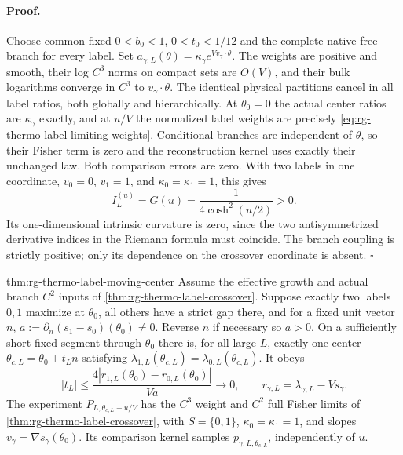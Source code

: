 \paragraph{Proof.}
Choose common fixed $0<b_0<1$, $0<t_0<1/12$ and the complete native
free branch for every label. Set
$a_{\gamma,L}(\theta)=\kappa_\gamma e^{Vv_\gamma\cdot\theta}$.
The weights are positive and smooth, their log $C^3$ norms on compact
sets are $O(V)$, and their bulk logarithms converge in $C^3$ to
$v_\gamma\cdot\theta$. The identical physical partitions cancel in
all label ratios, both globally and hierarchically. At $\theta_0=0$
the actual center ratios are $\kappa_\gamma$ exactly, and at $u/V$
the normalized label weights are precisely
\cref{eq:rg-thermo-label-limiting-weights}. Conditional branches are
independent of $\theta$, so their Fisher term is zero and the
reconstruction kernel uses exactly their unchanged law. Both
comparison errors are zero. With two labels in one coordinate,
$v_0=0$, $v_1=1$, and $\kappa_0=\kappa_1=1$, this gives
\begin{equation}
 I_L^{(u)}=G(u)=\frac1{4\cosh^2(u/2)}>0.
 \label{eq:rg-thermo-label-binary-native-window}
\end{equation}
Its one-dimensional intrinsic curvature is zero, since the two
antisymmetrized derivative indices in the Riemann formula must
coincide. The branch coupling is strictly positive; only its dependence
on the crossover coordinate is absent. $\square$

{thm:rg-thermo-label-moving-center}
Assume the effective growth and actual branch $C^2$ inputs of
\cref{thm:rg-thermo-label-crossover}. Suppose exactly two labels
$0,1$ maximize at $\theta_0$, all others have a strict gap there, and
for a fixed unit vector $n$,
$a:=\partial_n(s_1-s_0)(\theta_0)\ne0$. Reverse $n$ if necessary so
$a>0$. On a sufficiently short fixed segment through $\theta_0$ there
is, for all large $L$, exactly one center
$\theta_{c,L}=\theta_0+t_Ln$ satisfying
$\lambda_{1,L}(\theta_{c,L})=\lambda_{0,L}(\theta_{c,L})$.
It obeys
\begin{equation}
 |t_L|\leq\frac{4|r_{1,L}(\theta_0)-r_{0,L}(\theta_0)|}{Va}
 \longrightarrow0,
 \qquad r_{\gamma,L}=\lambda_{\gamma,L}-Vs_\gamma.
 \label{eq:rg-thermo-label-moving-center-bound}
\end{equation}
The experiment $P_{L,\theta_{c,L}+u/V}$ has the $C^3$ weight and $C^2$
full Fisher limits of \cref{thm:rg-thermo-label-crossover}, with
$S=\{0,1\}$, $\kappa_0=\kappa_1=1$, and slopes
$v_\gamma=\nabla s_\gamma(\theta_0)$. Its comparison kernel samples
$p_{\gamma,L,\theta_{c,L}}$, independently of $u$.\thermoestablishedstatus


